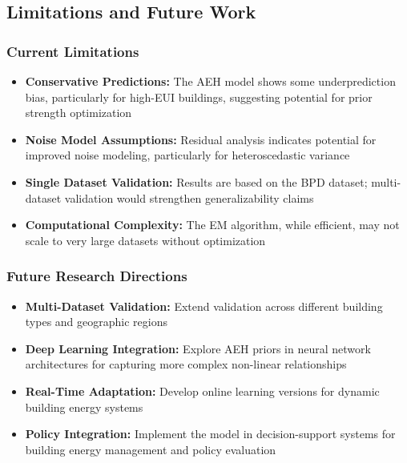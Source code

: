 \subsection{Limitations and Future Work}

\subsubsection{Current Limitations}

\begin{itemize}
    \item \textbf{Conservative Predictions:} The AEH model shows some underprediction bias, particularly for high-EUI buildings, suggesting potential for prior strength optimization
    
    \item \textbf{Noise Model Assumptions:} Residual analysis indicates potential for improved noise modeling, particularly for heteroscedastic variance
    
    \item \textbf{Single Dataset Validation:} Results are based on the BPD dataset; multi-dataset validation would strengthen generalizability claims
    
    \item \textbf{Computational Complexity:} The EM algorithm, while efficient, may not scale to very large datasets without optimization
\end{itemize}

\subsubsection{Future Research Directions}

\begin{itemize}
    \item \textbf{Multi-Dataset Validation:} Extend validation across different building types and geographic regions
    
    \item \textbf{Deep Learning Integration:} Explore AEH priors in neural network architectures for capturing more complex non-linear relationships
    
    \item \textbf{Real-Time Adaptation:} Develop online learning versions for dynamic building energy systems
    
    \item \textbf{Policy Integration:} Implement the model in decision-support systems for building energy management and policy evaluation
\end{itemize}

